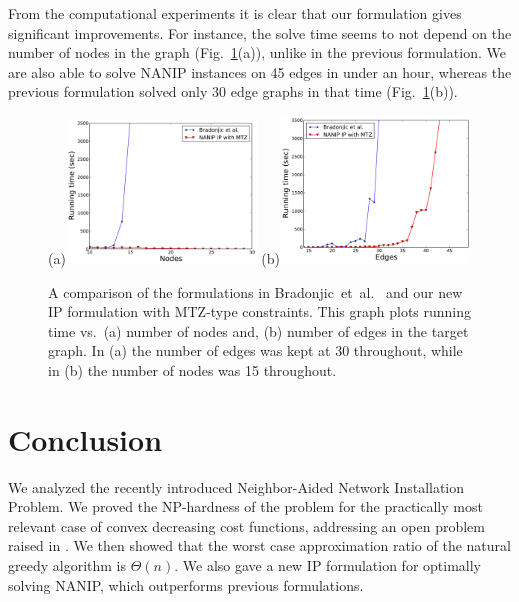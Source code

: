 \documentclass[english]{llncs}
\begin{document}
From the computational experiments it is clear that our formulation gives
significant improvements.  For instance, the solve time seems to not depend on
the number of nodes in the graph (Fig.~\ref{fig:iptime}(a)), unlike in the
previous formulation.  We are also able to solve NANIP instances on 45 edges in
under an hour, whereas the previous formulation solved only 30 edge graphs in
that time (Fig.~\ref{fig:iptime}(b)).

\begin{figure}[th]
\begin{centering}
(a)\includegraphics[width=0.45\textwidth]{perf_ip_nodes} 
(b)\includegraphics[width=0.45\textwidth]{perf_ip_edges} 
\par
\end{centering}
\caption{A comparison of the formulations in
Bradonjic~et~al.~\cite{Gutfraind14} and our new IP formulation with MTZ-type
constraints.  This graph plots running time vs.\ (a) number of nodes and, (b)
number of edges in the target graph.
In (a) the number of edges was kept at 30 throughout, while in (b) the number
of nodes was 15 throughout.\label{fig:iptime}} 
\end{figure}


\section{Conclusion} \label{sec:concl}
We analyzed the recently introduced Neighbor-Aided Network Installation
Problem.  We proved the NP-hardness of the problem for the practically most
relevant case of convex decreasing cost functions, addressing an open problem
raised in \cite{Gutfraind14}.  We then showed that the worst case approximation
ratio of the natural greedy algorithm is $\Theta(n)$.  We also gave a new IP
formulation for optimally solving NANIP, which outperforms previous
formulations.
\end{document}
